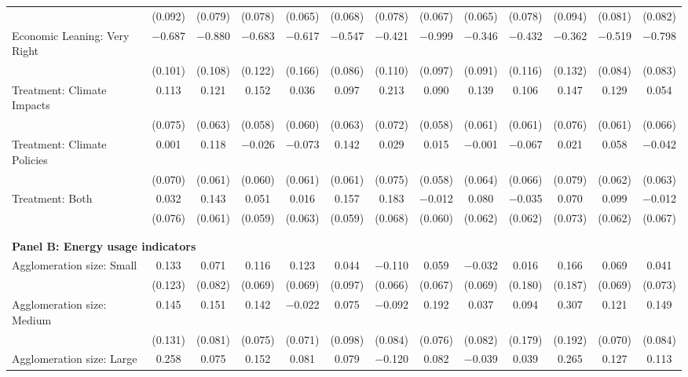 \begin{tabular}{@{\extracolsep{5pt}}lcccccccccccc}
  & (0.092) & (0.079) & (0.078) & (0.065) & (0.068) & (0.078) & (0.067) & (0.065) & (0.078) & (0.094) & (0.081) & (0.082) \\ 
  Economic Leaning: Very Right & $-$0.687 & $-$0.880 & $-$0.683 & $-$0.617 & $-$0.547 & $-$0.421 & $-$0.999 & $-$0.346 & $-$0.432 & $-$0.362 & $-$0.519 & $-$0.798 \\ 
  & (0.101) & (0.108) & (0.122) & (0.166) & (0.086) & (0.110) & (0.097) & (0.091) & (0.116) & (0.132) & (0.084) & (0.083) \\ 
  Treatment: Climate Impacts & 0.113 & 0.121 & 0.152 & 0.036 & 0.097 & 0.213 & 0.090 & 0.139 & 0.106 & 0.147 & 0.129 & 0.054 \\ 
  & (0.075) & (0.063) & (0.058) & (0.060) & (0.063) & (0.072) & (0.058) & (0.061) & (0.061) & (0.076) & (0.061) & (0.066) \\ 
  Treatment: Climate Policies & 0.001 & 0.118 & $-$0.026 & $-$0.073 & 0.142 & 0.029 & 0.015 & $-$0.001 & $-$0.067 & 0.021 & 0.058 & $-$0.042 \\ 
  & (0.070) & (0.061) & (0.060) & (0.061) & (0.061) & (0.075) & (0.058) & (0.064) & (0.066) & (0.079) & (0.062) & (0.063) \\ 
  Treatment: Both & 0.032 & 0.143 & 0.051 & 0.016 & 0.157 & 0.183 & $-$0.012 & 0.080 & $-$0.035 & 0.070 & 0.099 & $-$0.012 \\ 
  & (0.076) & (0.061) & (0.059) & (0.063) & (0.059) & (0.068) & (0.060) & (0.062) & (0.062) & (0.073) & (0.062) & (0.067) \\ 
 \\[1ex] \hline \\[1ex]
\multicolumn{ 13 }{l}{\textbf{ Panel B: Energy usage indicators }} \\
  Agglomeration size: Small & 0.133 & 0.071 & 0.116 & 0.123 & 0.044 & $-$0.110 & 0.059 & $-$0.032 & 0.016 & 0.166 & 0.069 & 0.041 \\ 
  & (0.123) & (0.082) & (0.069) & (0.069) & (0.097) & (0.066) & (0.067) & (0.069) & (0.180) & (0.187) & (0.069) & (0.073) \\ 
  Agglomeration size: Medium & 0.145 & 0.151 & 0.142 & $-$0.022 & 0.075 & $-$0.092 & 0.192 & 0.037 & 0.094 & 0.307 & 0.121 & 0.149 \\ 
  & (0.131) & (0.081) & (0.075) & (0.071) & (0.098) & (0.084) & (0.076) & (0.082) & (0.179) & (0.192) & (0.070) & (0.084) \\ 
  Agglomeration size: Large & 0.258 & 0.075 & 0.152 & 0.081 & 0.079 & $-$0.120 & 0.082 & $-$0.039 & 0.039 & 0.265 & 0.127 & 0.113 \\ 

\end{tabular}
